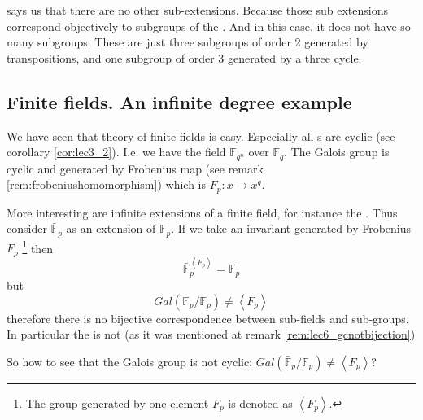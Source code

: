 \begin{example}
   says us that there are no other
  sub-extensions. Because those sub extensions correspond objectively
  to subgroups of the . And in this case, it
  does not have so many subgroups. These are just three subgroups of order 2
  generated by transpositions, and one subgroup of order 3 generated
  by a three cycle.  
  \label{ex:lec6_discriminant3degree}
\end{example}

\subsection{Finite fields. An infinite degree example}
\label{sec:lec6_finitefield}
We have seen that theory of finite fields is easy. Especially all
s are cyclic (see corollary
\ref{cor:lec3_2}). I.e. we have the field $\mathbb{F}_{q^n}$ over
$\mathbb{F}_{q}$. The Galois group is cyclic and generated by
Frobenius map (see remark \ref{rem:frobeniushomomorphism}) which is
$F_p: x \to x^q$.

More interesting are infinite extensions of a finite field, for
instance the .
Thus consider $\bar{\mathbb{F}}_p$ as an extension of
$\mathbb{F}_p$. If we take an invariant generated by Frobenius $F_p$
\footnote {
  The group generated by one element $F_p$ is denoted as $\left<F_p\right>$.
}
then
\[
\bar{\mathbb{F}}_p^{\left<F_p\right>} = \mathbb{F}_p
\]
but
\[
Gal\left(\bar{\mathbb{F}}_p/\mathbb{F}_p\right) \ne
\left<F_p\right>
\]
therefore there is no bijective correspondence between sub-fields and
sub-groups. In particular the  is
not  (as it was mentioned at remark
\ref{rem:lec6_gcnotbijection})

So how to see that the Galois group is not cyclic:
$Gal\left(\bar{\mathbb{F}}_p/\mathbb{F}_p\right) \ne
\left<F_p\right>$?

